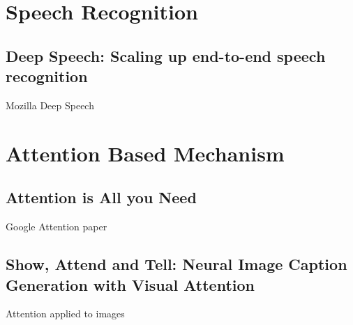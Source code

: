 \documentclass[12pt]{article}
\begin{document}
\section{Speech Recognition}
\subsection{Deep Speech: Scaling up end-to-end speech recognition}
Mozilla Deep Speech \cite{Hannun2014}

\section{Attention Based Mechanism}
\subsection{Attention is All you Need}
Google Attention paper \cite{Vaswani2017}

\subsection{Show, Attend and Tell: Neural Image Caption Generation with Visual
Attention}
Attention applied to images \cite{Xu2015}





\end{document}
